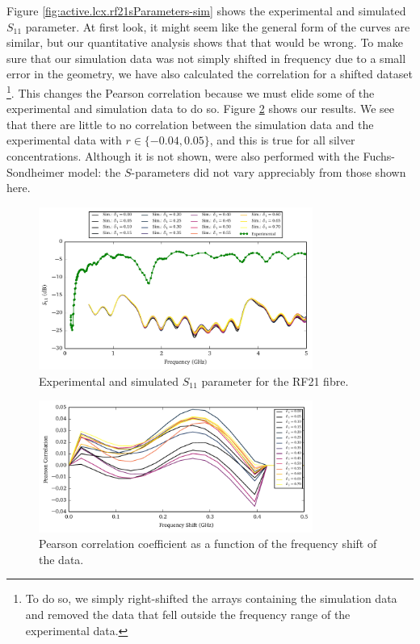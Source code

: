 Figure \ref{fig:active.lcx.rf21sParameters-sim} shows the experimental and simulated
$S_{11}$ parameter. At first look, it might seem like the general form 
of the curves are similar, but our quantitative analysis shows
that that would be wrong. To make sure that our simulation data was not simply
shifted in frequency due to a small error in the geometry, we have
also calculated the correlation for a shifted dataset 
\footnote{To do so, we simply right-shifted the arrays containing
the simulation data and removed the data that fell outside the frequency range 
of the experimental data.}. This changes
the Pearson correlation because we must elide some of the experimental
and simulation data to do so. Figure \ref{fig:antenna.shiftCorrelation}
shows our results. We see that there are little to no correlation
between the simulation data and the experimental data with $r\in\{-0.04,0.05\}$, 
and this is true for all silver concentrations. Although it is not shown, were
also performed with the Fuchs-Sondheimer model: the $S$-parameters did not
vary appreciably from those shown here.

\begin{figure}
 \centering
 \includegraphics[width=0.8\textwidth]{figs/active/sParameters-concSweepS11.pdf}
 \caption[Experimental and simulated $S_{11}$ parameter for the RF21 fibre]
	 {Experimental and simulated $S_{11}$ parameter for the RF21 fibre.}
 \label{fig:active.lcx.rf21sParameters-concSweep}
\end{figure}

\begin{figure}
 \centering
 \includegraphics[width=0.8\textwidth]{figs/active/shiftCorrelationS11.pdf}
 \caption{Pearson correlation coefficient as a function of the frequency
	  shift of the data.}
 \label{fig:antenna.shiftCorrelation}
\end{figure}

